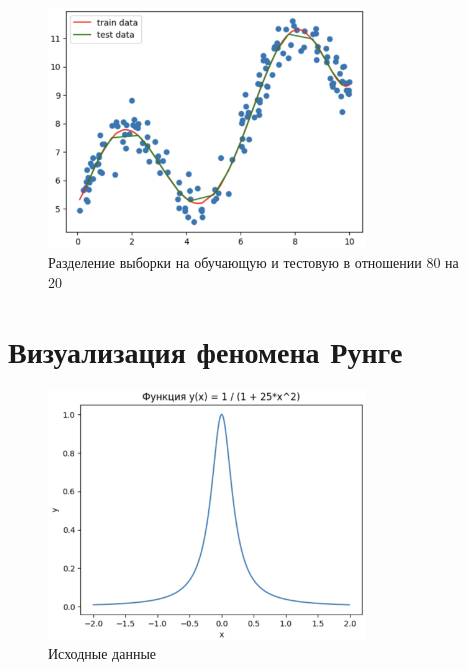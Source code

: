 \begin{figure}
	\begin{center}
		\includegraphics[width=0.75\textwidth]{images/3.png}
	\end{center}
	\caption{Разделение выборки на обучающую и тестовую в отношении 80 на 20}
	\label{img:3}
\end{figure}

\clearpage

\section{Визуализация феномена Рунге}

\begin{figure}
	\begin{center}
		\includegraphics[width=0.75\textwidth]{images/4.png}
	\end{center}
	\caption{Исходные данные}
	\label{img:4}
\end{figure}

